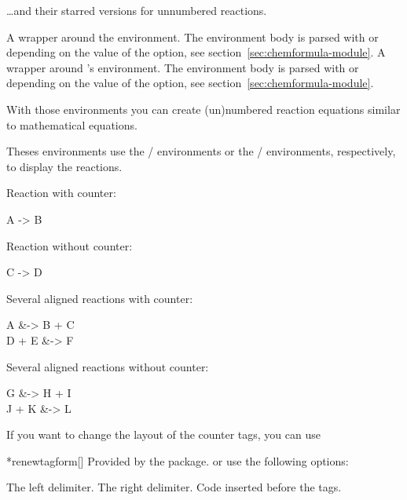 \documentclass{chemmacros-manual}
\makeatletter
\renewenvironment{commands}
  {%
    \let\command\cnltx@command
    \let\explcommand\cnltx@explcommand
    \cnltxlist
  }
  {\endcnltxlist}
\makeatother
\begin{document}
\ldots and their starred versions for unnumbered reactions.
\begin{environments}
    A wrapper around the  environment.  The environment body
    is parsed with  or  depending on the value of the
     option, see section~\vref{sec:chemformula-module}.
    A wrapper around 's  environment.  The
    environment body is parsed with  or  depending on the value
    of the  option, see
    section~\vref{sec:chemformula-module}.
\end{environments}

With those environments you can create (un)numbered reaction equations similar
to mathematical equations.

Theses environments use the / environments or
the / environments, respectively, to display the
reactions.

\begin{example}
  Reaction with counter:
  \begin{reaction}
    A -> B
  \end{reaction}
\end{example}

\begin{example}
  Reaction without counter:
  \begin{reaction*}
    C -> D
  \end{reaction*}
\end{example}

\begin{example}
  Several aligned reactions with counter:
  \begin{reactions}
    A     &-> B + C \\
    D + E &-> F
  \end{reactions}
\end{example}

\begin{example}
  Several aligned reactions without counter:
  \begin{reactions*}
    G     &-> H + I \\
    J + K &-> L
  \end{reactions*}
\end{example}

If you want to change the layout of the counter tags, you can use
\begin{commands}
  \command*{renewtagform}[]
    Provided by the  package.
\end{commands}
or use the following options:
\begin{options}
  \Default{\{}
    The left delimiter.
  \Default{\}}
    The right delimiter.
  \Default
    Code inserted before the tags.
\end{options}
\end{document}
